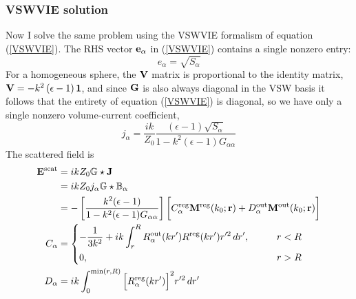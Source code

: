 \documentclass[letterpaper]{article}
\begin{document}
\subsubsection*{VSWVIE solution}

Now I solve the same problem using the VSWVIE formalism of equation
(\ref{VSWVIE}). The RHS vector $\mathbf{e}_\alpha$ in (\ref{VSWVIE})
contains a single nonzero entry: 
$$ e_\alpha=\sqrt{S_{\alpha}} $$
For a homogeneous sphere, the $\mathbf{V}$ matrix is
proportional to the identity matrix,
$\mathbf{V}=-k^2\left(\epsilon-1\right)\mathbf{1}$,
and since $\mathbf{G}$ is also always diagonal in the VSW basis
it follows that the entirety of equation (\ref{VSWVIE}) is
diagonal, so we have only a single nonzero volume-current coefficient,
$$ j_\alpha =
    \frac{ik}{Z_0}\frac{(\epsilon-1)\sqrt{S_\alpha}}
                       {1-k^2(\epsilon-1)G_{\alpha\alpha}}
$$
The scattered field is
\begin{align*}
 \mathbf{E}^{\text{\scriptsize scat}} 
    &= i k Z_0 \mathbb{G} \star \mathbf{J} 
\\
    &= i k Z_0 j_\alpha \mathbb{G} \star \mathbb{B}_\alpha
\\
    &= 
 -\left[\frac{k^2 (\epsilon-1)}{1-k^2(\epsilon-1)G_{\alpha\alpha}}\right]
  \bigg[  C_\alpha^{\text{\scriptsize reg}} \mathbf{M}^{\text{\scriptsize reg}}(k_0; \mathbf{r})
          +D_\alpha^{\text{\scriptsize out}} \mathbf{M}^{\text{\scriptsize out}}(k_0; \mathbf{r})
  \bigg]
\\
C_\alpha &= 
  \begin{dcases}
   -\frac{1}{3k^2}
   + ik \int_r^R R^{\text{\scriptsize out}}_\alpha(kr^\prime) R^{\text{\scriptsize reg}}(kr^\prime) 
                    r^{\prime 2}\,dr^\prime 
   , \qquad &r<R
   \\
   0, \qquad &r>R
  \end{dcases}
\\
D_\alpha &= 
  ik\int_0^{\text{min}(r,R)}
    \Big[ R^{\text{\scriptsize reg}}_\alpha(kr^\prime) \Big]^2 r^{\prime 2}\,dr^\prime
\end{align*}

 
\newpage
\end{document}
